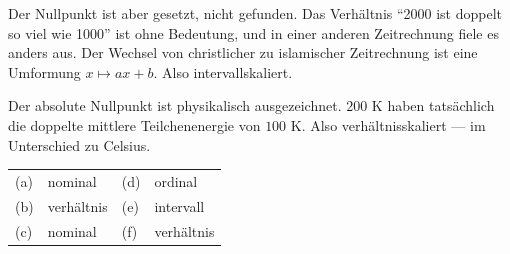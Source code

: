 \begin{aufgabe}
Der Nullpunkt ist aber gesetzt, nicht gefunden. Das Verhältnis \enquote{2000 ist doppelt so viel wie 1000} ist ohne Bedeutung, und in einer anderen Zeitrechnung fiele es anders aus. Der Wechsel von christlicher zu islamischer Zeitrechnung ist eine Umformung $x \mapsto ax+b$. Also intervallskaliert.

Der absolute Nullpunkt ist physikalisch ausgezeichnet. $200$ K haben tatsächlich die doppelte mittlere Teilchenenergie von $100$ K. Also verhältnisskaliert --- im Unterschied zu Celsius.

\begin{center}
\renewcommand{\arraystretch}{1.42}
\begin{tabular}{@{}P{1.0cm}P{2.6cm}P{1.0cm}P{2.6cm}@{}}
\toprule
(a) & nominal & (d) & ordinal\\
(b) & verhältnis & (e) & intervall\\
(c) & nominal & (f) & verhältnis\\
\bottomrule
\end{tabular}
\end{center}
\end{aufgabe}

